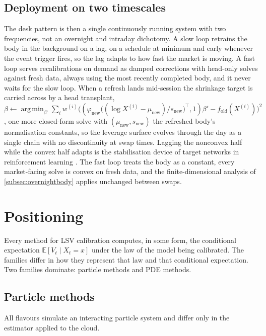 \documentclass[11pt,a4paper]{article}
\theoremstyle{plain}
\theoremstyle{definition}
\theoremstyle{definition}
\newcommand{\E}{\mathbb{E}}
\begin{document}
\subsection{Deployment on two timescales}

The desk pattern is then a single continuously running system with two frequencies, not an overnight and intraday dichotomy. A slow loop retrains the body in the background on a lag, on a schedule at minimum and early whenever the event trigger fires, so the lag adapts to how fast the market is moving. A fast loop serves recalibrations on demand as damped corrections with head-only solves against fresh data, always using the most recently completed body, and it never waits for the slow loop. When a refresh lands mid-session the shrinkage target is carried across by a head transplant, $\beta \leftarrow \operatorname*{arg\,min}_{\beta'} \sum_i w^{(i)} \bigl((\varphi_{\mathrm{new}}\bigl((\log X^{(i)} - \mu_{\mathrm{new}})/s_{\mathrm{new}}\bigr)^{\top}, 1)\beta' - f_{\mathrm{old}}(X^{(i)})\bigr)^2$, one more closed-form solve with $(\mu_{\mathrm{new}}, s_{\mathrm{new}})$ the refreshed body's normalisation constants, so the leverage surface evolves through the day as a single chain with no discontinuity at swap times. Lagging the nonconvex half while the convex half adapts is the stabilisation device of target networks in reinforcement learning \citep{mnih2015}. The fast loop treats the body as a constant, every market-facing solve is convex on fresh data, and the finite-dimensional analysis of \cref{subsec:overnightbody} applies unchanged between swaps.

\section{Positioning}\label{sec:positioning}

Every method for LSV calibration computes, in some form, the conditional expectation $\E[V_t \mid X_t = x]$ under the law of the model being calibrated. The families differ in how they represent that law and that conditional expectation. Two families dominate: particle methods and PDE methods.

\subsection{Particle methods}

All flavours simulate an interacting particle system and differ only in the estimator applied to the cloud.
\end{document}

